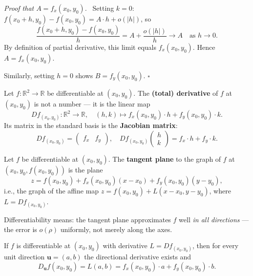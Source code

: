 \documentclass[11pt]{report}
\renewenvironment{proof}[1][Proof]{\par\noindent\textit{#1.}\ }{\hfill$\square$\par\medskip}
\newcommand{\R}{\mathbb{R}}
\begin{document}
\begin{proof}[Proof that $A = f_x(x_0, y_0)$]
Setting $k = 0$: $f(x_0 + h, y_0) - f(x_0, y_0) = A \cdot h + o(|h|)$, so
\[
\frac{f(x_0 + h, y_0) - f(x_0, y_0)}{h} = A + \frac{o(|h|)}{h} \to A \quad \text{as } h \to 0.
\]
By definition of partial derivative, this limit equals $f_x(x_0, y_0)$. Hence $A = f_x(x_0, y_0)$.

Similarly, setting $h = 0$ shows $B = f_y(x_0, y_0)$.
\end{proof}


\begin{definition}
Let $f: \R^2 \to \R$ be differentiable at $(x_0, y_0)$. The \textbf{(total) derivative} of $f$ at $(x_0, y_0)$ is not a number --- it is the linear map
\[
Df_{(x_0, y_0)}: \R^2 \to \R, \quad (h, k) \mapsto f_x(x_0, y_0) \cdot h + f_y(x_0, y_0) \cdot k.
\]
Its matrix in the standard basis is the \textbf{Jacobian matrix}:
\[
Df_{(x_0, y_0)} = \begin{pmatrix} f_x & f_y \end{pmatrix}, \quad Df_{(x_0,y_0)} \begin{pmatrix} h \\ k \end{pmatrix} = f_x \cdot h + f_y \cdot k.
\]
\end{definition}

\begin{definition}
Let $f$ be differentiable at $(x_0, y_0)$. The \textbf{tangent plane} to the graph of $f$ at $(x_0, y_0, f(x_0, y_0))$ is the plane
\[
z = f(x_0, y_0) + f_x(x_0, y_0)(x - x_0) + f_y(x_0, y_0)(y - y_0),
\]
i.e., the graph of the affine map $z = f(x_0, y_0) + L(x - x_0, y - y_0)$, where $L = Df_{(x_0,y_0)}$.
\end{definition}

\begin{remark}
Differentiability means: the tangent plane approximates $f$ well \textit{in all directions} --- the error is $o(\rho)$ uniformly, not merely along the axes.
\end{remark}

\begin{theorem}
If $f$ is differentiable at $(x_0, y_0)$ with derivative $L = Df_{(x_0,y_0)}$, then for every unit direction $\mathbf{u} = (a, b)$ the directional derivative exists and
\[
D_{\mathbf{u}} f(x_0, y_0) = L(a, b) = f_x(x_0,y_0) \cdot a + f_y(x_0,y_0) \cdot b.
\]
\end{theorem}
\end{document}
